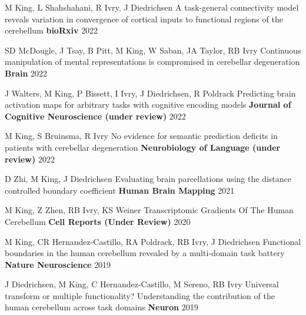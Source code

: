 \begin{cventries}

  \cventry
    {M King, L Shahshahani, R Ivry, J Diedrichsen} %
    {A task-general connectivity model reveals variation in convergence of cortical inputs to functional regions of the cerebellum} %
    {\textbf{bioRxiv}} %
    {2022} %
    {}
    

  \cventry
    {SD McDougle, J Tsay, B Pitt, M King, W Saban, JA Taylor, RB Ivry} %
    {Continuous manipulation of mental representations is compromised in cerebellar degeneration} %
    {\textbf{Brain}} %
    {2022} %
    {}
    
  \cventry
    {J Walters, M King, P Bissett, I Ivry, J Diedrichsen, R Poldrack} %
    {Predicting brain activation maps for arbitrary tasks with cognitive encoding models} %
    {\textbf{Journal of Cognitive Neuroscience (under review)}} %
    {2022} %
    {}
    
  \cventry
    {M King, S Bruinsma, R Ivry} %
    {No evidence for semantic prediction deficits in patients with cerebellar degeneration} %
    {\textbf{Neurobiology of Language (under review)}} %
    {2022} %
    {}

  \cventry
    {D Zhi, M King, J Diedrichsen} %
    {Evaluating brain parcellations using the distance controlled boundary coefficient} %
    {\textbf{Human Brain Mapping}} %
    {2021} %
    {}
    
  \cventry
    {M King, Z Zhen, RB Ivry, KS Weiner} %
    {Transcriptomic Gradients Of The Human Cerebellum} %
    {\textbf{Cell Reports (Under Review)}} %
    {2020} %
    {}
    
  \cventry
    {M King, CR Hernandez-Castillo, RA Poldrack, RB Ivry, J Diedrichsen} %
    {Functional boundaries in the human cerebellum revealed by a multi-domain task battery} %
    {\textbf{Nature Neuroscience}} %
    {2019} %
    {}
    
  \cventry
    {J Diedrichsen, M King, C Hernandez-Castillo, M Sereno, RB Ivry} %
    {Universal transform or multiple functionality? Understanding the contribution of the human cerebellum across task domains} %
    {\textbf{Neuron}} %
    {2019} %
    {}
    

\end{cventries}
